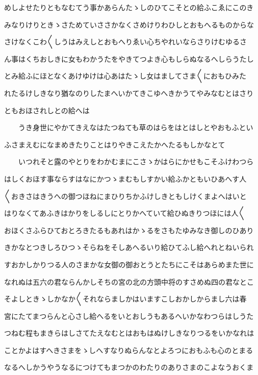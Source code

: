 \documentclass[a4paper,11pt,landscape]{ltjtarticle}
\begin{document}
\par\medskip
めしよせたりともなむてう事かあらんたゝしのひてこそとの給ふこゑにこのき
\par\medskip
みなりけりときゝさためていささかなくさめけりわひしとおもへるものからな
\par\medskip
さけなくこわ〱しうはみえしとおもへりゑい心ちやれいならさりけむゆるさ
\par\medskip
ん事はくちおしきに女もわかうたをやきてつよき心もしらぬなるへしらうたし
\par\medskip
とみ給ふにほとなくあけゆけは心あはたゝし女はましてさま〱におもひみた
\par\medskip
れたるけしきなり猶なのりしたまへいかてきこゆへきかうてやみなむとはさり
\par\medskip
ともおほされしとの給へは
\par\medskip
　　うき身世にやかてきえなはたつねても草のはらをはとはしとやおもふとい
\par\medskip
ふさまえむになまめきたりことはりやきこえたかへたるもしかなとて
\par\medskip
　　いつれそと露のやとりをわかむまにこさゝかはらにかせもこそふけわつら
\par\medskip
はしくおほす事ならすはなにかつゝまむもしすかい給ふかともいひあへす人
\par\medskip
〱おきさはきうへの御つほねにまひりちかふけしきともしけくまよへはいと
\par\medskip
はりなくてあふきはかりをしるしにとりかへていて給ひぬきりつほには人〱
\par\medskip
おほくさふらひておとろきたるもあれはかゝるをさもたゆみなき御しのひあり
\par\medskip
きかなとつきしろひつゝそらねをそしあへるいり給ひてふし給へれとねいられ
\par\medskip
すおかしかりつる人のさまかな女御の御おとうとたちにこそはあらめまた世に
\par\medskip
なれぬは五六の君ならんかしそちの宮の北の方頭中将のすさめぬ四の君なとこ
\par\medskip
そよしときゝしかなか〱それならましかはいますこしおかしからまし六は春
\par\medskip
宮にたてまつらんと心さし給へるをいとおしうもあるへいかなわつらはしうた
\par\medskip
つねむ程もまきらはしさてたえなむとはおもはぬけしきなりつるをいかなれは
\par\medskip
ことかよはすへきさまをゝしへすなりぬらんなとよろつにおもふも心のとまる
\par\medskip
なるへしかうやうなるにつけてもまつかのわたりのありさまのこよなうおくま
\end{document}

